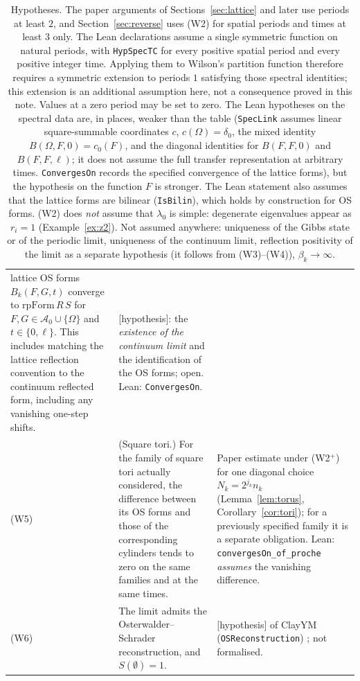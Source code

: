 \documentclass[11pt,a4paper]{article}
\theoremstyle{plain}
\theoremstyle{definition}
\theoremstyle{remark}
\numberwithin{equation}{section}
\newcommand{\st}[1]{\textsf{[#1]}}
\newcommand{\cA}{\mathcal{A}}
\begin{document}
\begin{table}[ht]
\begin{tabular}{@{}>{\raggedright\arraybackslash}p{}>{\raggedright\arraybackslash}p{}%
>{\raggedright\arraybackslash}p{}@{}}
lattice OS forms $B_k(F,G,t)$ converge to $\mathrm{rpForm}\,R\,S$ for $F,G\in\cA_0\cup\{\Omega\}$ and $t\in\{0,\ell\}$. This includes matching the
lattice reflection convention to the continuum reflected form, including any vanishing one-step shifts. & \st{hypothesis}: the
\emph{existence of the continuum limit} and the identification of the OS forms; open. Lean: \texttt{ConvergesOn}.\\
(W5) & (Square tori.) For the family of square tori actually considered, the difference between its OS forms and those of the corresponding
cylinders tends to zero on the same families and at the same times. & Paper estimate under (W2$^+$) for one diagonal choice
$N_k=2^{j_k}n_k$ (Lemma~\ref{lem:torus}, Corollary~\ref{cor:tori}); for a previously specified family it is a separate obligation. Lean:
\texttt{convergesOn\_of\_proche} \emph{assumes} the vanishing difference.\\
(W6) & The limit admits the Osterwalder--Schrader reconstruction, and $S(\emptyset)=1$. & \st{hypothesis} of ClayYM
(\texttt{OSReconstruction}) \cite{OS73,OS75,ClayYM}; not formalised.\\
\bottomrule
\end{tabular}
\caption{Hypotheses. The paper arguments of Sections~\ref{sec:lattice} and later use periods at least $2$, and Section~\ref{sec:reverse} uses (W2) for spatial periods and times at least $3$ only. The Lean declarations assume a single symmetric function on natural periods, with \texttt{HypSpecTC} for every positive spatial period and every positive integer time. Applying them to Wilson's partition function therefore requires a symmetric extension to periods $1$ satisfying those spectral identities; this extension is an additional assumption here, not a consequence proved in this note. Values at a zero period may be set to zero. The Lean hypotheses on the spectral data are, in places, weaker than the table (\texttt{SpecLink} assumes linear square-summable coordinates $c$, $c(\Omega)=\delta_0$, the mixed identity $B(\Omega,F,0)=c_0(F)$, and the diagonal identities for $B(F,F,0)$ and $B(F,F,\ell)$; it does not assume the full transfer representation at arbitrary times. \texttt{ConvergesOn} records the specified convergence of the lattice forms), but the hypothesis on the function $F$ is stronger. The Lean
statement also assumes that the lattice forms are bilinear (\texttt{IsBilin}), which holds by construction for OS forms. (W2) does
\emph{not} assume that $\lambda_0$ is simple: degenerate eigenvalues appear as $r_i=1$ (Example~\ref{ex:z2}). Not assumed anywhere: uniqueness of the Gibbs state or of the periodic limit, uniqueness of the continuum limit, reflection positivity of
the limit as a separate hypothesis (it follows from (W3)--(W4)), $\beta_k\to\infty$.}
\label{tab:hyp}
\end{table}
\end{document}
